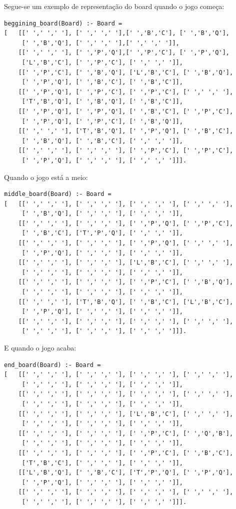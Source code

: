 \documentclass[a4paper]{article}
\begin{document}
Segue-se um exemplo de representação do board quando o jogo começa:

\begin{lstlisting}
beggining_board(Board) :- Board =
[	[[' ',' ',' '], [' ',' ',' '],[' ','B','C'], [' ','B','Q'],
	 [' ','B','Q'], [' ',' ',' '],[' ',' ',' ']],
	[[' ',' ',' '], [' ','P','Q'],[' ','P','C'], [' ','P','Q'],
 	 ['L','B','C'], [' ','P','C'], [' ',' ',' ']],
	[[' ','P','C'], [' ','B','Q'], ['L','B','C'], [' ','B','Q'],
	 [' ','P','Q'], [' ','B','C'], [' ','B','C']],
	[[' ','P','Q'], [' ','P','C'], [' ','P','C'], [' ',' ',' '],
	 ['T','B','Q'], [' ','B','Q'], [' ','B','C']],
 	[[' ','P','Q'], [' ','P','Q'], [' ','B','C'], [' ','P','C'],
 	 [' ','P','Q'], [' ','P','C'], [' ','B','Q']],
 	[[' ',' ',' '], ['T','B','Q'], [' ','P','Q'], [' ','B','C'],
 	 [' ','B','Q'], [' ','B','C'], [' ',' ',' ']],
 	[[' ',' ',' '], [' ',' ',' '], [' ','P','C'], [' ','P','C'],
 	 [' ','P','Q'], [' ',' ',' '], [' ',' ',' ']]].
\end{lstlisting}

Quando o jogo está a meio:

\begin{lstlisting}
middle_board(Board) :- Board =
[	[[' ',' ',' '], [' ',' ',' '], [' ',' ',' '], [' ',' ',' '],
	 [' ','B','Q'], [' ',' ',' '], [' ',' ',' ']],
 	[[' ',' ',' '], [' ',' ',' '], [' ','P','Q'], [' ','P','C'],
 	 [' ','B','C'], ['T','P','Q'], [' ',' ',' ']],
	[[' ',' ',' '], [' ',' ',' '], [' ','P','Q'], [' ',' ',' '],
	 [' ','P','Q'], [' ',' ',' '], [' ',' ',' ']],
	[[' ',' ',' '], [' ',' ',' '], ['L','B','C'], [' ',' ',' '],
	 [' ',' ',' '], [' ',' ',' '], [' ',' ',' ']],
 	[[' ',' ',' '], [' ',' ',' '], [' ','P','C'], [' ','B','Q'],
 	 [' ',' ',' '], [' ',' ',' '], [' ',' ',' ']],
 	[[' ',' ',' '], ['T','B','Q'], [' ','B','C'], ['L','B','C'],
 	 [' ','P','Q'], [' ',' ',' '], [' ',' ',' ']],
 	[[' ',' ',' '], [' ',' ',' '], [' ',' ',' '], [' ',' ',' '],
 	 [' ',' ',' '], [' ',' ',' '], [' ',' ',' ']]].
\end{lstlisting}

E quando o jogo acaba:

\begin{lstlisting}
end_board(Board) :- Board =
[	[[' ',' ',' '], [' ',' ',' '], [' ',' ',' '], [' ',' ',' '],
	 [' ',' ',' '], [' ',' ',' '], [' ',' ',' ']],
 	[[' ',' ',' '], [' ',' ',' '], [' ',' ',' '], [' ',' ',' '],
 	 [' ',' ',' '], [' ',' ',' '], [' ',' ',' ']],
	[[' ',' ',' '], [' ',' ',' '], ['L','B','C'], [' ',' ',' '],
	 [' ',' ',' '], [' ',' ',' '], [' ',' ',' ']],
	[[' ',' ',' '], [' ',' ',' '], [' ','P','C'], [' ','Q','B'],
	 [' ',' ',' '], [' ',' ',' '], [' ',' ',' ']],
 	[[' ',' ',' '], [' ',' ',' '], [' ','P','C'], [' ','B','C'],
 	 ['T','B','C'], [' ',' ',' '], [' ',' ',' ']],
 	[['L','B','Q'], [' ','B','C'], ['T','P','Q'], [' ','P','Q'],
 	 [' ','P','Q'], [' ',' ',' '], [' ',' ',' ']],
 	[[' ',' ',' '], [' ',' ',' '], [' ',' ',' '], [' ',' ',' '],
 	 [' ',' ',' '], [' ',' ',' '], [' ',' ',' ']]].
\end{lstlisting}
\end{document}
